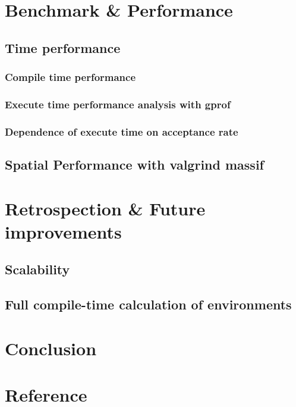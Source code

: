 \documentclass[11pt,a4paper]{scrartcl}
\begin{document}
\section{Benchmark \& Performance}
\subsection{Time performance}
\subsubsection{Compile time performance}
\subsubsection{Execute time performance analysis with gprof}
\subsubsection{Dependence of execute time on acceptance rate}
\subsection{Spatial Performance with valgrind massif}
\section{Retrospection \& Future improvements}
\subsection{Scalability}
\subsection{Full compile-time calculation of environments}
\section{Conclusion}
\section{Reference}
\end{document}
